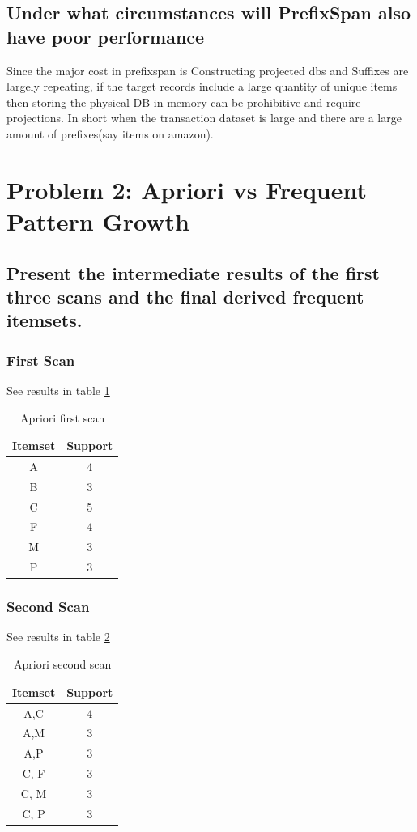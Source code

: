\documentclass[11pt]{article}
\begin{document}
\subsection{Under what circumstances will PrefixSpan also have poor performance}
Since the major cost in prefixspan is Constructing projected dbs and Suffixes are largely repeating, if the target records include a large quantity of unique items then storing the physical DB in memory can be prohibitive and require projections. In short when the transaction dataset is large and there are a large amount of prefixes(say items on amazon).  
\section{Problem 2: Apriori vs Frequent Pattern Growth}
\subsection{Present the intermediate results of the first three scans and the final derived frequent itemsets.}
\subsubsection{First Scan}
See results in table \ref{tab:1st}
\begin{table}[!htbp]
    \centering
    \begin{tabular}{|c|c|} \hline
        Itemset & Support \\ \hline
        A & 4 \\ \hline
        B & 3 \\ \hline
        C & 5 \\ \hline
        F & 4 \\ \hline
        M & 3 \\ \hline
        P & 3 \\ \hline
    \end{tabular}
    \caption{Apriori first scan}
    \label{tab:1st}
\end{table}
\subsubsection{Second Scan}
See results in table \ref{tab:2nd}
\begin{table}[!htbp]
    \centering
    \begin{tabular}{|c|c|} \hline
        Itemset & Support \\ \hline
        A,C & 4 \\ \hline
        A,M & 3 \\ \hline
        A,P & 3 \\ \hline
        C, F & 3 \\ \hline
        C, M & 3 \\ \hline
        C, P & 3 \\ \hline
    \end{tabular}
    \caption{Apriori second scan}
    \label{tab:2nd}
\end{table}
\end{document}
